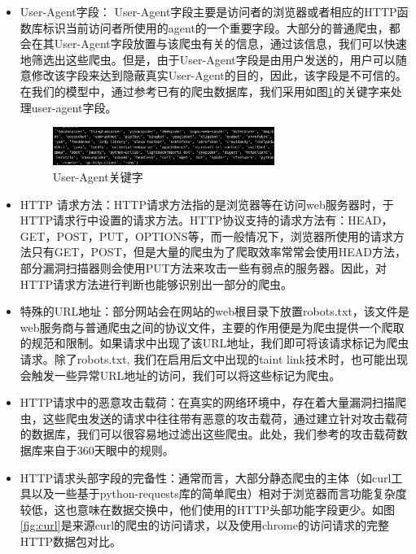 \documentclass[doctor,privacy,twoside]{buaa_mac}
\begin{document}
\begin{itemize}
\item[(1)] User-Agent字段： User-Agent字段主要是访问者的浏览器或者相应的HTTP函数库标识当前访问者所使用的agent的一个重要字段。大部分的普通爬虫，都会在其User-Agent字段放置与该爬虫有关的信息，通过该信息，我们可以快速地筛选出这些爬虫。但是，由于User-Agent字段是由用户发送的，用户可以随意修改该字段来达到隐蔽真实User-Agent的目的，因此，该字段是不可信的。在我们的模型中，通过参考已有的爬虫数据库，我们采用如图\ref{fig:ua}的关键字来处理user-agent字段。
    
\centerline{}
\begin{figure}[!h]
  \centering
  \includegraphics[width=0.68\textwidth]{images/crawler_key_words.png}
  \caption{User-Agent关键字}
  \label{fig:ua}
\end{figure}

    
\item[(2)] HTTP 请求方法：HTTP请求方法指的是浏览器等在访问web服务器时，于HTTP请求行中设置的请求方法。HTTP协议支持的请求方法有：HEAD，GET，POST，PUT，OPTIONS等，而一般情况下，浏览器所使用的请求方法只有GET，POST，但是大量的爬虫为了爬取效率常常会使用HEAD方法，部分漏洞扫描器则会使用PUT方法来攻击一些有弱点的服务器。因此，对HTTP请求方法进行判断也能够识别出一部分的爬虫。

\item[(3)] 特殊的URL地址：部分网站会在网站的web根目录下放置robots.txt，该文件是web服务商与普通爬虫之间的协议文件，主要的作用便是为爬虫提供一个爬取的规范和限制。如果请求中出现了该URL地址，我们即可将该请求标记为爬虫请求。除了robots.txt, 我们在启用后文中出现的taint link技术时，也可能出现会触发一些异常URL地址的访问，我们可以将这些标记为爬虫。

\item[(4)] HTTP请求中的恶意攻击载荷：在真实的网络环境中，存在着大量漏洞扫描爬虫，这些爬虫发送的请求中往往带有恶意的攻击载荷，通过建立针对攻击载荷的数据库，我们可以很容易地过滤出这些爬虫。此处，我们参考的攻击载荷数据库来自于360天眼中的规则。

\item[(5)] HTTP请求头部字段的完备性：通常而言，大部分静态爬虫的主体（如curl工具以及一些基于python-requests库的简单爬虫）相对于浏览器而言功能复杂度较低，这也意味在数据交换中，他们使用的HTTP头部功能字段更少。如图\ref{fig:curl}是来源curl的爬虫的访问请求，以及使用chrome的访问请求的完整HTTP数据包对比。
\end{itemize}
\end{document}
